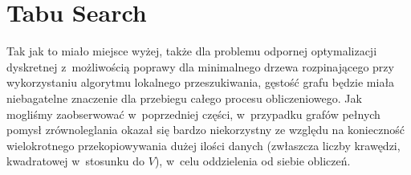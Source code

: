 \section{Tabu Search}




Tak jak to miało miejsce wyżej, także dla problemu odpornej optymalizacji dyskretnej z~możliwością poprawy dla minimalnego drzewa rozpinającego przy wykorzystaniu algorytmu lokalnego przeszukiwania, gęstość grafu będzie miała niebagatelne znaczenie dla przebiegu całego procesu obliczeniowego.
Jak mogliśmy zaobserwować w~poprzedniej części, w~przypadku grafów pełnych pomysł zrównoleglania okazał się bardzo niekorzystny ze względu na konieczność wielokrotnego przekopiowywania dużej ilości danych (zwłaszcza liczby krawędzi, kwadratowej w~stosunku do $V$), w~celu oddzielenia od siebie obliczeń.

